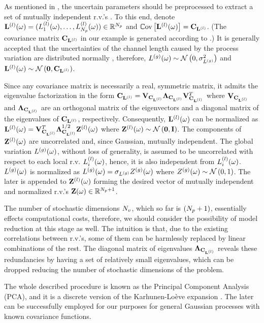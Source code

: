 As mentioned in , the uncertain parameters should be preprocessed to extract a set of mutually independent r.v.'s \cite{xiu2009}. To this end, denote $\vlLeff(\o) = \vec{\lLeff_1(\o), \dotsc, \lLeff_\cores(\o)} \in \real^\cores$ and $\oCov{\vlLeff(\o)} = \mCov_\vlLeff$. (The covariance matrix $\mCov_\vlLeff$ in our example is generated according to .) It is generally accepted that the uncertainties of the channel length caused by the process variation are distributed normally \cite{srivastava2010, liu2007, juan2012}, therefore, ${L^{(g)}}(\omega) \sim \mathcal{N}\left( 0, \sigma^2_{L^{(g)}} \right)$ and $\vlLeff(\o) \sim \normal{\vZero}{\mCov_\vlLeff}$.

Since any covariance matrix is necessarily a real, symmetric matrix, it admits the eigenvalue factorization \cite{press2007} in the form $\mCov_\vlLeff = \m{V}_{\mCov_\vlLeff} \m{\Lambda}_{\mCov_\vlLeff} \m{V}_{\mCov_\vlLeff}^T$ where $\m{V}_{\mCov_\vlLeff}$ and $\m{\Lambda}_{\mCov_\vlLeff}$ are an orthogonal matrix of the eigenvectors and a diagonal matrix of the eigenvalues of $\mCov_\vlLeff$, respectively. Consequently, $\vlLeff(\o)$ can be normalized as $\vlLeff(\o) = \m{V}_{\mCov_\vlLeff}^T \m{\Lambda}_{\mCov_\vlLeff}^\ifrac{1}{2} \vlZ(\o)$ where $\vlZ(\o) \sim \normal{\vZero}{\mI}$. The components of ${\mathbf{Z}^{(l)}}(\omega)$ are uncorrelated and, since Gaussian, mutually independent. The global variation ${L^{(g)}}(\omega)$, without loss of generality, is assumed to be uncorrelated with respect to each local r.v. $L^{(l)}_i(\omega)$, hence, it is also independent from $L^{(l)}_i(\omega)$. ${L^{(g)}}(\omega)$ is normalized as ${L^{(g)}}(\omega) = \sigma_{L^{(g)}} {Z^{(g)}}(\omega)$ where ${Z^{(g)}}(\omega) \sim \mathcal{N}\left( 0, 1 \right)$. The later is appended to ${\mathbf{Z}^{(l)}}(\omega)$ forming the desired vector of mutually independent and normalized r.v.'s $\mathbf{Z}(\omega) \in \mathbb{R}^{{N_p} + 1}$.

The number of stochastic dimensions ${N_v}$, which so far is $({N_p} + 1)$, essentially effects computational costs, therefore, we should consider the possibility of model reduction at this stage as well. The intuition is that, due to the existing correlations between r.v.'s, some of them can be harmlessly replaced by linear combinations of the rest. The diagonal matrix of eigenvalues $\m{\Lambda}_{\mCov_\vlLeff}$ reveals these redundancies by having a set of relatively small eigenvalues, which can be dropped reducing the number of stochastic dimensions of the problem.

The whole described procedure is known as the Principal Component Analysis (PCA), and it is a discrete version of the Karhunen-Lo\`{e}ve expansion \cite{loeve1978}. The later can be successfully employed for our purposes for general Gaussian processes with known covariance functions.

